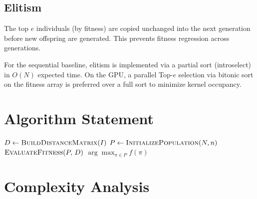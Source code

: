 \documentclass[11pt, letterpaper]{article}
\begin{document}
\subsection{Elitism}

The top $e$ individuals (by fitness) are copied unchanged into the next
generation before new offspring are generated.  This prevents fitness
regression across generations.

For the sequential baseline, elitism is implemented via a partial sort
(introselect) in $O(N)$ expected time.  On the GPU, a parallel Top-$e$
selection via bitonic sort on the fitness array is preferred over a full sort
to minimize kernel occupancy.

\section{Algorithm Statement}

\begin{algorithm}[H]
\DontPrintSemicolon
\SetAlgoLined
\LinesNumbered
{}
\BlankLine
$D \gets \textsc{BuildDistanceMatrix}(I)$\;
$P \gets \textsc{InitializePopulation}(N, n)$\;
$\textsc{EvaluateFitness}(P,\, D)$\;
\BlankLine
{}
\BlankLine
\Return $\arg\max_{\pi \in P} f(\pi)$\;
\caption{Sequential Reference GA for TSP}
\label{alg:ga}
\end{algorithm}

\section{Complexity Analysis}
\end{document}

